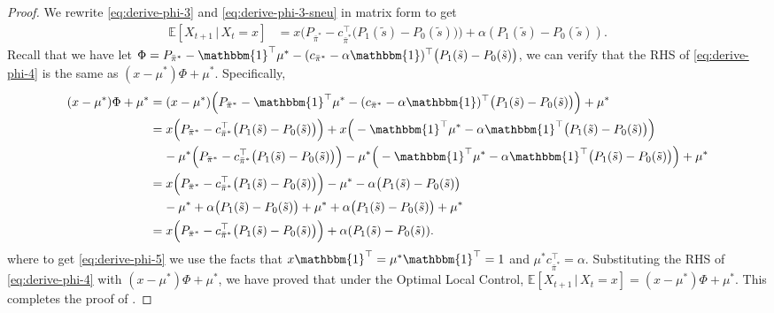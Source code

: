 \documentclass[11pt,letterpaper]{article}
\theoremstyle{plain}
\theoremstyle{definition}
\theoremstyle{remark}
\newcommand{\E}[1]{\mathbb{E}\left[#1\right]}
\newcommand{\givenplain}{\,|\,}
\newcommand{\vone}{\mathbbm{1}}
\newcommand{\pibar}{{\sysbar{\pi}}}
\newcommand{\pibs}{{\pibar^*}}
\newcommand{\sysbar}[1]{\bar{#1}}
\newcommand{\costvec}{c_\pibs}
\newcommand{\statdist}{\mu^*}
\newcommand{\sneu}{\tilde{s}}
\begin{document}
\begin{proof}
We rewrite \eqref{eq:derive-phi-3} and \eqref{eq:derive-phi-3-sneu} in matrix form to get 
\begin{align}\label{eq:derive-phi-4}
    \E{X_{t+1} \givenplain X_t=x} 
    &= x\Big(P_\pibs - \costvec^\top \big(P_1(\sneu) - P_0(\sneu)\big) \Big) + \alpha (P_1(\sneu) - P_0(\sneu)).
\end{align}
Recall that we have let $\Phi = P_\pibs - \vone^\top \statdist - (\costvec - \alpha \vone)^\top \big(P_1(\sneu) - P_0(\sneu)\big)$, we can verify that the RHS of \eqref{eq:derive-phi-4} is the same as $(x-\statdist)\Phi + \statdist$. Specifically, 
\begin{align}
    (x-\statdist)\Phi + \statdist 
    \nonumber
    &= (x-\statdist)\Big(P_\pibs - \vone^\top \statdist - (\costvec - \alpha \vone)^\top \big(P_1(\sneu) - P_0(\sneu)\big)\Big) + \statdist \\
    \nonumber
    &= x \Big(P_\pibs - \costvec^\top \big(P_1(\sneu) - P_0(\sneu)\big) \Big) + x\Big(- \vone^\top \statdist -  \alpha \vone^\top \big(P_1(\sneu) - P_0(\sneu)\big)\Big) \\
    \nonumber
    &\mspace{20mu} - \statdist \Big(P_\pibs - \costvec^\top \big(P_1(\sneu) - P_0(\sneu)\big) \Big) - \statdist \Big(- \vone^\top \statdist -  \alpha \vone^\top \big(P_1(\sneu) - P_0(\sneu)\big)\Big) + \statdist\\
    \nonumber
    &= x \Big(P_\pibs - \costvec^\top \big(P_1(\sneu) - P_0(\sneu)\big) \Big) - \statdist - \alpha \big(P_1(\sneu) - P_0(\sneu)\big) \\
    \label{eq:derive-phi-5}
    &\mspace{20mu} - \statdist  + \alpha \big(P_1(\sneu) - P_0(\sneu)\big) +  \statdist +  \alpha \big(P_1(\sneu) - P_0(\sneu)\big) + \statdist \\
    \nonumber
    &= x\Big(P_\pibs - \costvec^\top \big(P_1(\sneu) - P_0(\sneu)\big) \Big) + \alpha (P_1(\sneu) - P_0(\sneu)). 
\end{align}
where to get \eqref{eq:derive-phi-5} we use the facts that $x\vone^\top = \statdist \vone^\top = 1$ and $\statdist \costvec^\top = \alpha$. 
Substituting the RHS of \eqref{eq:derive-phi-4}  with $(x-\statdist)\Phi + \statdist$, we have proved that under the Optimal Local Control, $\E{X_{t+1} \givenplain X_t=x} = (x-\statdist)\Phi + \statdist$. 
This completes the proof of . 
\end{proof}
\end{document}

